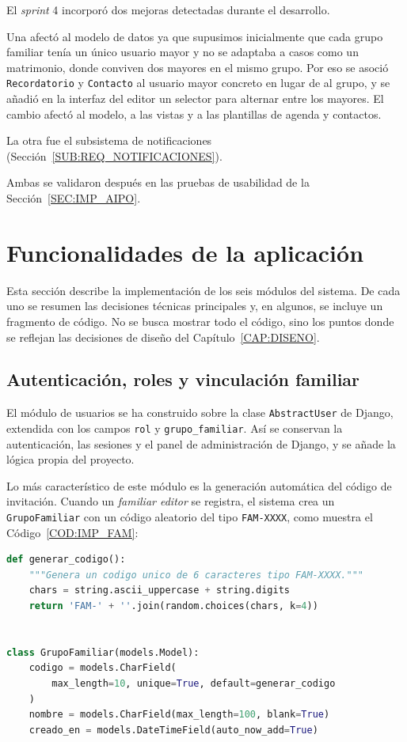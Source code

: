 El \emph{sprint} 4 incorporó dos mejoras detectadas durante el desarrollo.

Una afectó al modelo de datos ya que supusimos inicialmente que cada grupo
familiar tenía un único usuario mayor y no se adaptaba a casos como un
matrimonio, donde conviven dos mayores en el mismo grupo. Por eso se asoció
\texttt{Recordatorio} y \texttt{Contacto} al usuario mayor concreto en
lugar de al grupo, y se añadió en la interfaz del editor un selector para
alternar entre los mayores. El cambio afectó al modelo, a las vistas y a
las plantillas de agenda y contactos.

La otra fue el subsistema de notificaciones (Sección~\ref{SUB:REQ_NOTIFICACIONES}).

Ambas se validaron después en las pruebas de usabilidad de la
Sección~\ref{SEC:IMP_AIPO}.


\section{Funcionalidades de la aplicación\label{SEC:IMP_FUNCIONALIDADES}}

Esta sección describe la implementación de los seis módulos del sistema.
De cada uno se resumen las decisiones técnicas principales y, en algunos,
se incluye un fragmento de código. No se busca mostrar todo el código, sino
los puntos donde se reflejan las decisiones de diseño del
Capítulo~\ref{CAP:DISENO}.

\subsection{Autenticación, roles y vinculación
familiar\label{SUB:IMP_AUTENTICACION}}

El módulo de usuarios se ha construido sobre la clase \texttt{AbstractUser}
de Django, extendida con los campos \texttt{rol} y \texttt{grupo\_familiar}.
Así se conservan la autenticación, las sesiones y el panel de
administración de Django, y se añade la lógica propia del proyecto.

Lo más característico de este módulo es la generación automática del código
de invitación. Cuando un \emph{familiar editor} se registra, el sistema
crea un \texttt{GrupoFamiliar} con un código aleatorio del tipo
\texttt{FAM-XXXX}, como muestra el Código~\ref{COD:IMP_FAM}:

\begin{lstlisting}[language=Python, caption={Generación automática
del código de invitación del grupo familiar.},
label={COD:IMP_FAM}]
def generar_codigo():
    """Genera un codigo unico de 6 caracteres tipo FAM-XXXX."""
    chars = string.ascii_uppercase + string.digits
    return 'FAM-' + ''.join(random.choices(chars, k=4))


class GrupoFamiliar(models.Model):
    codigo = models.CharField(
        max_length=10, unique=True, default=generar_codigo
    )
    nombre = models.CharField(max_length=100, blank=True)
    creado_en = models.DateTimeField(auto_now_add=True)
\end{lstlisting}

